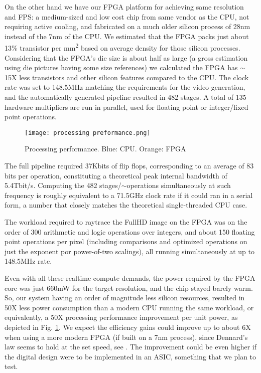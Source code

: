 \documentclass[conference]{IEEEtran}
\begin{document}
On the other hand we have our FPGA platform for achieving same resolution and FPS: a medium-sized and low cost chip from same vendor as the CPU, not requiring active cooling, and fabricated on a much older silicon process of 28nm instead of the 7nm of the CPU. We estimated that the FPGA packs just about 13\% transistor per mm\textsuperscript{2} based on average density for those silicon processes\cite{dennard}. Considering that the FPGA’s die size is about half as large (a gross estimation using die pictures having some size references) we calculated the FPGA has $\sim$15X less transistors and other silicon features compared to the CPU. The clock rate was set to 148.5MHz matching the requirements for the video generation, and the automatically generated pipeline resulted in 482 stages. A total of 135 hardware multipliers are run in parallel, used for floating point or integer/fixed point operations.

\begin{figure}
\texttt{[image: processing preformance.png]}
\caption{Processing performance. Blue: CPU. Orange: FPGA}
\label{figperf}
\end{figure}

The full pipeline required 37Kbits of flip flops, corresponding to an average of 83 bits per operation, constituting a theoretical peak internal bandwidth of 5.4Tbit/s. Computing the 482 stages/$\sim$operations simultaneously at such frequency is roughly equivalent to a 71.5GHz clock rate if it could ran in a serial form, a number that closely matches the theoretical single-threaded CPU case.

The workload required to raytrace the FullHD image on the FPGA was on the order of 300 arithmetic and logic operations over integers, and about 150 floating point operations per pixel (including comparisons and optimized operations on just the exponent por power-of-two scalings), all running simultaneously at up to 148.5MHz rate.

Even with all these realtime compute demands, the power required by the FPGA core was just 660mW for the target resolution, and the chip stayed barely warm. So, our system having an order of magnitude less silicon resources, resulted in 50X less power consumption than a modern CPU running the same workload, or equivalently, a 50X processing performance improvement per unit power, as depicted in Fig. \ref{figperf}. We expect the efficiency gains could improve up to about 6X when using a more modern FPGA (if built on a 7nm process), since Dennard's law seems to hold at the set speed, see \cite{dennard}. The improvement could be even higher if the digital design were to be implemented in an ASIC, something that we plan to test.
\\
\end{document}
